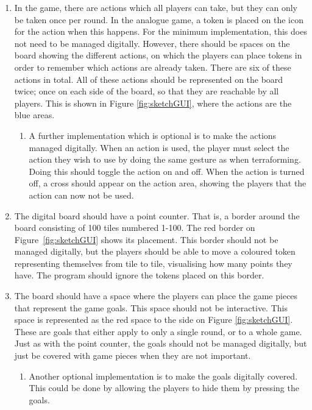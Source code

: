 \begin{enumerate}
\item In the game, there are actions which all players can take, but they can only be taken once per round. In the analogue game, a token is placed on the icon for the action when this happens. For the minimum implementation, this does not need to be managed digitally. However, there should be spaces on the board showing the different actions, on which the players can place tokens in order to remember which actions are already taken. There are six of these actions in total. All of these actions should be represented on the board twice; once on each side of the board, so that they are reachable by all players. This is shown in Figure \ref{fig:sketchGUI}, where the actions are the blue areas. 
	\begin{enumerate}
	\item A further implementation which is optional is to make the actions managed digitally. When an action is used, the player must select the action they wish to use by doing the same gesture as when terraforming. Doing this should toggle the action on and off. When the action is turned off, a cross should appear on the action area, showing the players that the action can now not be used.
	\end{enumerate}
\item The digital board should have a point counter. That is, a border around the board consisting of 100 tiles numbered 1-100. The red border on Figure~\ref{fig:sketchGUI} shows its placement. This border should not be managed digitally, but the players should be able to move a coloured token representing themselves from tile to tile, visualising how many points they have. The program should ignore the tokens placed on this border.
\item The board should have a space where the players can place the game pieces that represent the game goals. This space should not be interactive. This space is represented as the red space to the side on Figure \ref{fig:sketchGUI}. These are goals that either apply to only a single round, or to a whole game. Just as with the point counter, the goals should not be managed digitally, but just be covered with game pieces when they are not important.
	\begin{enumerate}
	\item Another optional implementation is to make the goals digitally covered. This could be done by allowing the players to hide them by pressing the goals.
	\end{enumerate}
\end{enumerate}